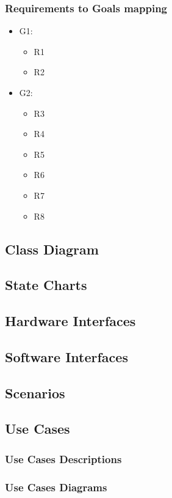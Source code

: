 \documentclass[]{article}
\begin{document}
\subsubsection{Requirements to Goals mapping}
\begin{itemize}
	\item G1:
	\begin{itemize}
		\item R1
		\item R2
	\end{itemize}
	\item G2:
	\begin{itemize}
		\item R3
		\item R4
		\item R5
		\item R6
		\item R7
		\item R8
	\end{itemize}
\end{itemize}


\subsection{Class Diagram}
\subsection{State Charts}
\subsection{Hardware Interfaces}
\subsection{Software Interfaces}
\subsection{Scenarios}
\subsection{Use Cases}
\subsubsection{Use Cases Descriptions}
\subsubsection{Use Cases Diagrams}
\end{document}
